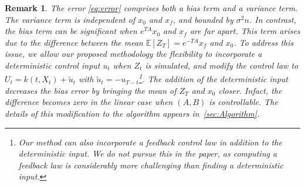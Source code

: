 \documentclass[letterpaper, 10 pt, conference]{ieeeconf}  %
\newtheorem{remark}{Remark}
\newcommand{\Ali}[1]{{\color{magenta}[Ali: #1]}}
\begin{document}
\begin{remark}\label{rem:improve-alg}
    The error \eqref{eq:error} comprises both a bias term and a variance term. The variance term is independent of $x_0$ and $x_f$, and bounded by $\sigma^2n$. In contrast, the bias term can be significant when $e^{TA}x_0$ and $x_f$ are far apart. This term arises due to the difference between the mean $\mathbb E[Z_T]=e^{-TA}x_f$ and $x_0$. To address this issue, we allow our proposed methodology the flexibility to incorporate a deterministic control input $u_t$ when $Z_t$ is simulated, and modify the control law to  $U_t = k(t,X_t) + \tilde u_t$ with $\tilde u_t = -u_{T-t}$\footnote{Our method can also incorporate a feedback control law in addition to the deterministic input. We do not pursue this in the paper, as computing a feedback law is considerably more challenging than finding a deterministic input.}. The addition of the deterministic input decreases the bias error by bringing the mean of $Z_T$ and $x_0$ closer. Infact, the difference becomes zero in the linear case when $(A,B)$ is controllable.  The details of this modification to the algorithm appears in~\ref{sec:Algorithm}. 
    
    
\end{remark}
\end{document}
